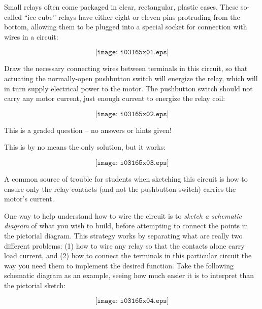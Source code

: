 

Small relays often come packaged in clear, rectangular, plastic cases.  These so-called ``ice cube'' relays have either eight or eleven pins protruding from the bottom, allowing them to be plugged into a special socket for connection with wires in a circuit:

$$\texttt{[image: i03165x01.eps]}$$

Draw the necessary connecting wires between terminals in this circuit, so that actuating the normally-open pushbutton switch will energize the relay, which will in turn supply electrical power to the motor.  The pushbutton switch should not carry any motor current, just enough current to energize the relay coil:

$$\texttt{[image: i03165x02.eps]}$$







This is a graded question -- no answers or hints given!







This is by no means the only solution, but it works:

$$\texttt{[image: i03165x03.eps]}$$

A common source of trouble for students when sketching this circuit is how to ensure only the relay contacts (and not the pushbutton switch) carries the motor's current.  

\vskip 10pt

One way to help understand how to wire the circuit is to {\it sketch a schematic diagram} of what you wish to build, before attempting to connect the points in the pictorial diagram.  This strategy works by separating what are really two different problems: (1) how to wire any relay so that the contacts alone carry load current, and (2) how to connect the terminals in this particular circuit the way you need them to implement the desired function.  Take the following schematic diagram as an example, seeing how much easier it is to interpret than the pictorial sketch:

$$\texttt{[image: i03165x04.eps]}$$




